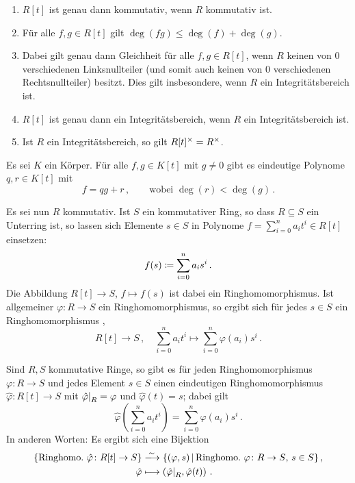 \begin{proposition}
  \begin{enumerate}
    \item
      $R[t]$ ist genau dann kommutativ, wenn $R$ kommutativ ist.
    \item
      Für alle $f, g \in R[t]$ gilt $\deg(fg) \leq \deg(f) + \deg(g)$.
    \item
      Dabei gilt genau dann Gleichheit für alle $f, g \in R[t]$, wenn $R$ keinen von $0$ verschiedenen Linksnullteiler \textup(und somit auch keinen von $0$ verschiedenen Rechtsnullteiler\textup) besitzt.
      Dies gilt insbesondere, wenn $R$ ein Integritätsbereich ist.
    \item
      $R[t]$ ist genau dann ein Integritätsbereich, wenn $R$ ein Integritätsbereich ist.
    \item
      Ist $R$ ein Integritätsbereich, so gilt $R[t]^{\times} = R^{\times}$.
  \end{enumerate}
\end{proposition}

\begin{proposition}[Polynomdivision]
  Es sei $K$ ein Körper.
  Für alle $f, g \in K[t]$ mit $g \neq 0$ gibt es eindeutige Polynome $q, r \in K[t]$ mit
  \[
    f = qg + r \,,
    \qquad
    \text{wobei $\deg(r) < \deg(g)$} \,.
  \]
\end{proposition}

Es sei nun $R$ kommutativ.
Ist $S$ ein kommutativer Ring, so dass $R \subseteq S$ ein Unterring ist, so lassen sich Elemente $s \in S$ in Polynome $f = \sum_{i=0}^n a_i t^i \in R[t]$ einsetzen:
\[
            f(s)
  \coloneqq  \sum_{i=0}^n a_i s^i \,.
\]
Die Abbildung $R[t] \to S$, $f \mapsto f(s)$ ist dabei ein Ringhomomorphismus.
Ist allgemeiner $\varphi \colon R \to S$ ein Ringhomomorphismus, so ergibt sich für jedes $s \in S$ ein Ringhomomorphismus ,
\[
          R[t]
  \to     S \,,
  \quad   \sum_{i=0}^n a_i t^i
  \mapsto \sum_{i=0}^n \varphi(a_i) s^i \,.
\]

\begin{theorem}
  Sind $R, S$ kommutative Ringe, so gibt es für jeden Ringhomomorphismus $\varphi \colon R \to S$ und jedes Element $s \in S$ einen eindeutigen Ringhomomorphismus $\hat{\varphi} \colon R[t] \to S$ mit $\restrict{\hat{\varphi}}{R} = \varphi$ und $\hat{\varphi}(t) = s$;
  dabei gilt
  \[
      \hat{\varphi}\left( \sum_{i=0}^n a_i t^i \right)
    = \sum_{i=0}^n \varphi(a_i) s^i \,.
  \]
  In anderen Worten:
  Es ergibt sich eine Bijektion
  \begin{align*}
                            \{ \text{Ringhomo.\ $\hat{\varphi} \colon R[t] \to S$} \}
    &\xlongrightarrow{\sim} \{
                              (\varphi, s)
                            \suchthat
                                \text{Ringhomo.\ $\varphi \colon R \to S$, $s \in S$}
                            \} \,,  \\
                            \hat{\varphi}
    &\longmapsto            \left( \restrict{\hat{\varphi}}{R}, \hat{\varphi}(t) \right) \,.
  \end{align*}
\end{theorem}



